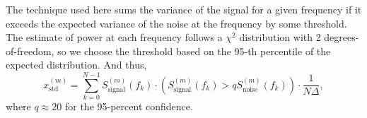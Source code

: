 \documentclass{ametsoc}
\begin{document}
The technique used here sums the variance of the signal for a given frequency if it exceeds the expected variance of the noise at the frequency by some threshold. The estimate of power at each frequency follows a $\chi^2$ distribution with 2 degrees-of-freedom, so we choose the threshold based on the 95-th percentile of the expected distribution. And thus,
\begin{equation}
x^{(m)}_{\textrm{std}} = \sum_{k=0}^{N-1} S^{(m)}_{\textrm{signal}}(f_k) \cdot \left( S^{(m)}_{\textrm{signal}}(f_k) > q S_{\textrm{noise}}^{(m)}(f_k) \right) \cdot \frac{1}{N \Delta},
\end{equation}
where $q\approx 20$ for the 95-percent confidence.





\end{document}
